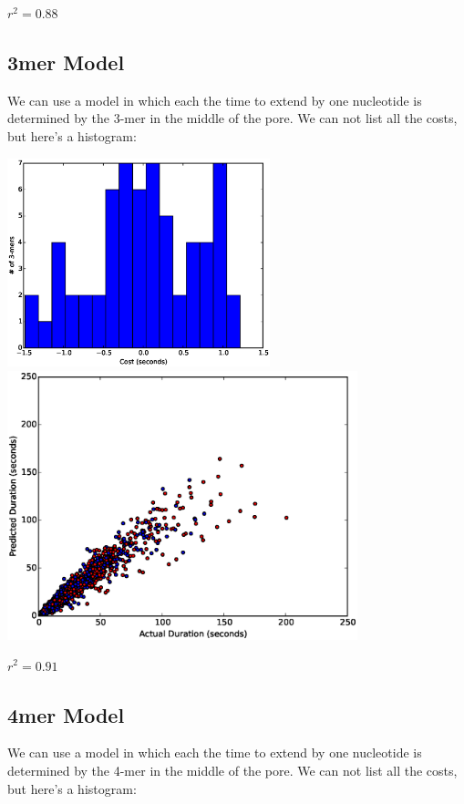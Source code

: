 $r^2=0.88$

\subsection*{3mer Model}

        We can use a model in which each the time to extend by one nucleotide is determined by the 3-mer in the middle of the
        pore.  We can not list all the costs, but here's a histogram:
        
\includegraphics[width=3in]{part11hist3}\\
\includegraphics[width=4in]{part11scatter3mer}

$r^2=0.91$

\subsection*{4mer Model}

        We can use a model in which each the time to extend by one nucleotide is determined by the 4-mer in the middle of the
        pore.  We can not list all the costs, but here's a histogram:
        
